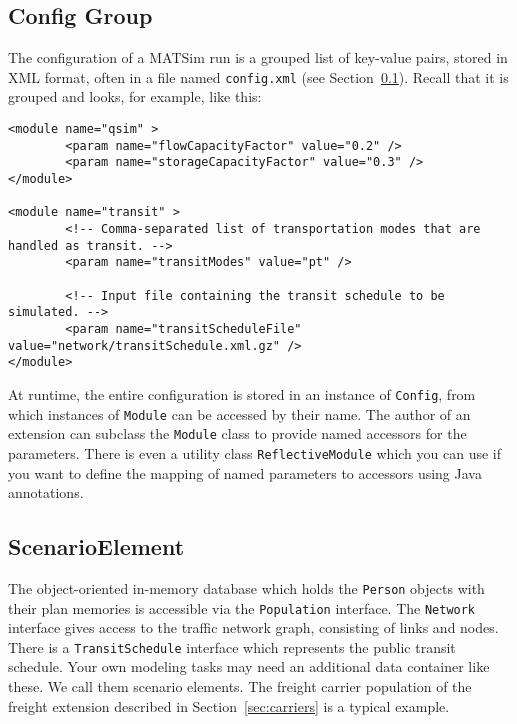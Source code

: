 \subsection{Config Group}
\label{sec:config}
The configuration of a MATSim run is a grouped list of key-value pairs, stored in XML
format, often in a file named \lstinline$config.xml$ (see Section~\ref{sec:config}).
Recall that it is grouped and looks, for example, like this:

\begin{lstlisting}
<module name="qsim" >
		<param name="flowCapacityFactor" value="0.2" />
		<param name="storageCapacityFactor" value="0.3" />
</module>

<module name="transit" >
		<!-- Comma-separated list of transportation modes that are handled as transit. -->
		<param name="transitModes" value="pt" />

		<!-- Input file containing the transit schedule to be simulated. -->
		<param name="transitScheduleFile" value="network/transitSchedule.xml.gz" />
</module>
\end{lstlisting}

At runtime, the entire configuration is stored in an instance of \lstinline$Config$, from which instances of \lstinline$Module$ can be accessed by their name.
The author of an extension can subclass the \lstinline$Module$ class to provide named accessors for the parameters.
There is even a utility class \lstinline$ReflectiveModule$ which you can use if you want to define the mapping of named parameters to accessors using Java annotations.

\subsection{ScenarioElement}
The object-oriented in-memory database which holds the \lstinline$Person$ objects with their plan memories is accessible via the
\lstinline$Population$ interface. The \lstinline$Network$ interface gives access to the traffic network graph, consisting of links and nodes.
There is a \lstinline$TransitSchedule$ interface which represents the public transit schedule. Your own modeling tasks may need an additional data container
like these. We call them scenario elements. The freight carrier population of the freight extension described in Section~\ref{sec:carriers} is a typical example. 

